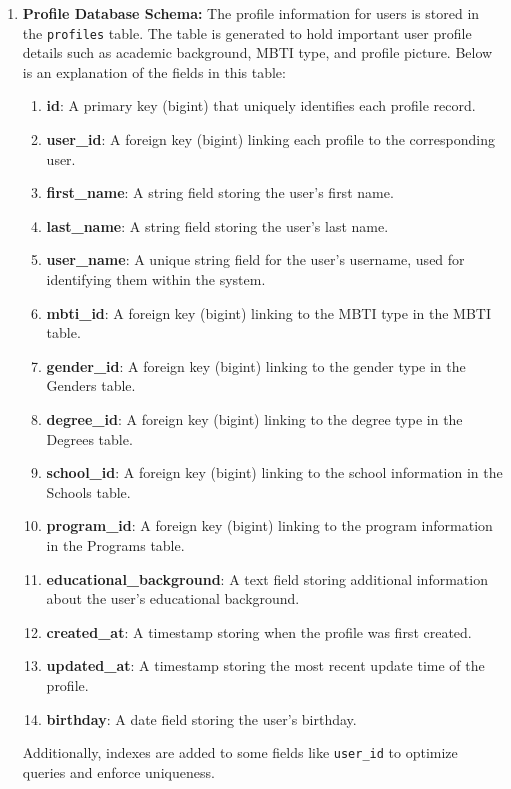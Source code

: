 \begin{enumerate}
    \newpage
    \item \textbf{Profile Database Schema:}
    The profile information for users is stored in the \texttt{profiles} table. The table is generated to hold important user profile details such as academic background, MBTI type, and profile picture. Below is an explanation of the fields in this table:

    \begin{enumerate}
        \item \textbf{id}: A primary key (bigint) that uniquely identifies each profile record.
        \item \textbf{user\_id}: A foreign key (bigint) linking each profile to the corresponding user.
        \item \textbf{first\_name}: A string field storing the user's first name.
        \item \textbf{last\_name}: A string field storing the user's last name.
        \item \textbf{user\_name}: A unique string field for the user's username, used for identifying them within the system.
        \item \textbf{mbti\_id}: A foreign key (bigint) linking to the MBTI type in the MBTI table.
        \item \textbf{gender\_id}: A foreign key (bigint) linking to the gender type in the Genders table.
        \item \textbf{degree\_id}: A foreign key (bigint) linking to the degree type in the Degrees table.
        \item \textbf{school\_id}: A foreign key (bigint) linking to the school information in the Schools table.
        \item \textbf{program\_id}: A foreign key (bigint) linking to the program information in the Programs table.
        \item \textbf{educational\_background}: A text field storing additional information about the user's educational background.
        \item \textbf{created\_at}: A timestamp storing when the profile was first created.
        \item \textbf{updated\_at}: A timestamp storing the most recent update time of the profile.
        \item \textbf{birthday}: A date field storing the user's birthday.\\
    \end{enumerate}

    Additionally, indexes are added to some fields like \texttt{user\_id} to optimize queries and enforce uniqueness.


\end{enumerate}
